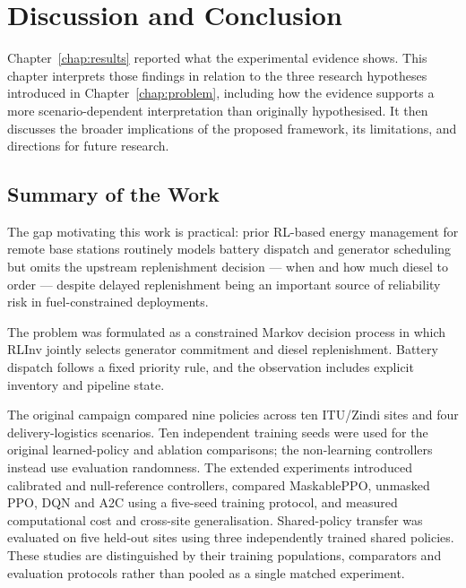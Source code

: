 \chapter{Discussion and Conclusion}
\label{chap:conclusion}
\setlength{\emergencystretch}{1.5em}

Chapter~\ref{chap:results} reported what the experimental evidence
shows. This chapter interprets those findings in relation to the three
research hypotheses introduced in
Chapter~\ref{chap:problem}, including how the evidence supports a more
scenario-dependent interpretation than originally hypothesised. It then
discusses the broader implications of the proposed framework, its
limitations, and directions for future research.

\section{Summary of the Work}
\label{sec:conclusion_summary}
\begin{sloppypar}

The gap motivating this work is
practical: prior RL-based energy management for remote base stations
routinely models battery dispatch and generator scheduling but omits
the upstream replenishment decision --- when and how much diesel to
order --- despite delayed replenishment being an important source of
reliability risk in fuel-constrained deployments.
\end{sloppypar}

\begin{revisedblock}
The problem was formulated as a constrained Markov decision
process in which RLInv jointly selects generator commitment
and diesel replenishment. Battery dispatch follows a fixed
priority rule, and the observation includes explicit
inventory and pipeline state.

The original campaign compared nine policies across ten
ITU/Zindi sites and four delivery-logistics scenarios.
Ten independent training seeds were used for the original
learned-policy and ablation comparisons; the non-learning
controllers instead use evaluation randomness. The
extended experiments introduced calibrated and null-reference
controllers, compared MaskablePPO, unmasked PPO, DQN and A2C
using a five-seed training protocol, and measured computational
cost and cross-site generalisation. Shared-policy transfer
was evaluated on five held-out sites using three independently
trained shared policies. These studies are distinguished by
their training populations, comparators and evaluation
protocols rather than pooled as a single matched experiment.
\end{revisedblock}

